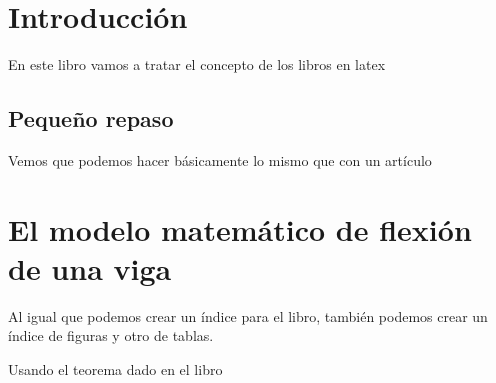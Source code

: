 \documentclass{book}
\begin{document}
	\tableofcontents
	\chapter{Introducción}
	En este libro vamos a tratar el concepto de los libros en latex
	\section{Pequeño repaso}
	Vemos que podemos hacer básicamente lo mismo que con un artículo
	\chapter{El modelo matemático de flexión de una viga}
	Al igual que podemos crear un índice para el libro, también podemos crear un índice de figuras y otro de tablas.

Usando el teorema dado en el libro \cite{articulo1} \cite{articulo2}




	
	
\end{document}
